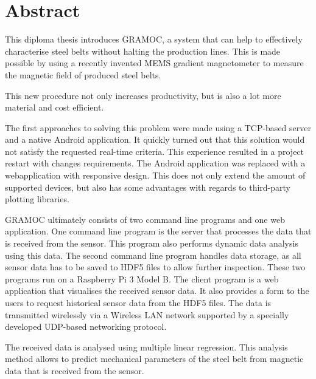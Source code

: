 \chapter{Abstract}

This diploma thesis introduces GRAMOC, a system that can help to effectively characterise steel belts without halting the production lines. This is made possible by using a recently invented MEMS gradient magnetometer to measure the magnetic field of produced steel belts.

This new procedure not only increases productivity, but is also a lot more material and cost efficient.

The first approaches to solving this problem were made using a TCP-based server and a native Android application. It quickly turned out that this solution would not satisfy the requested real-time criteria. This experience resulted in a project restart with changes requirements. The Android application was replaced with a webapplication with responsive design. This does not only extend the amount of supported devices, but also has some advantages with regards to third-party plotting libraries.

GRAMOC ultimately consists of two command line programs and one web application. One command line program is the server that processes the data that is received from the sensor. This program also performs dynamic data analysis using this data. The second command line program handles data storage, as all sensor data has to be saved to HDF5 files to allow further inspection. These two programs run on a Raspberry Pi 3 Model B. The client program is a web application that visualises the received sensor data. It also provides a form to the users to request historical sensor data from the HDF5 files. The data is transmitted wirelessly via a Wireless LAN network supported by a specially developed UDP-based networking protocol.

The received data is analysed using multiple linear regression. This analysis method allows to predict mechanical parameters of the steel belt from magnetic data that is received from the sensor.

